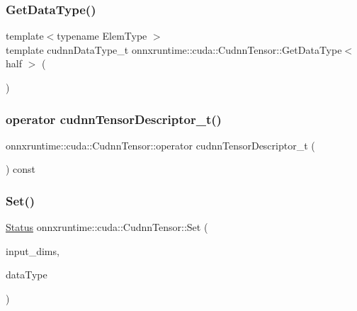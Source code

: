 \subsubsection{\texorpdfstring{Get\+Data\+Type()}{GetDataType()}}
{\footnotesize\ttfamily template$<$typename Elem\+Type $>$ \\
template cudnn\+Data\+Type\+\_\+t onnxruntime\+::cuda\+::\+Cudnn\+Tensor\+::\+Get\+Data\+Type$<$ half $>$ (\begin{DoxyParamCaption}{ }\end{DoxyParamCaption})\hspace{0.3cm}{\ttfamily [static]}}

\mbox{\label{classonnxruntime_1_1cuda_1_1CudnnTensor_ad3505f7bba117518557c347875f4f209}} 
\subsubsection{\texorpdfstring{operator cudnn\+Tensor\+Descriptor\+\_\+t()}{operator cudnnTensorDescriptor\_t()}}
{\footnotesize\ttfamily onnxruntime\+::cuda\+::\+Cudnn\+Tensor\+::operator cudnn\+Tensor\+Descriptor\+\_\+t (\begin{DoxyParamCaption}{ }\end{DoxyParamCaption}) const\hspace{0.3cm}{\ttfamily [inline]}}

\mbox{\label{classonnxruntime_1_1cuda_1_1CudnnTensor_a04f694f3b72ff6ac06511008d97c451d}} 
\subsubsection{\texorpdfstring{Set()}{Set()}\hspace{0.1cm}{\footnotesize\ttfamily [1/2]}}
{\footnotesize\ttfamily \mbox{\hyperlink{classonnxruntime_1_1common_1_1Status}{Status}} onnxruntime\+::cuda\+::\+Cudnn\+Tensor\+::\+Set (\begin{DoxyParamCaption}\item[{const std\+::vector$<$ int64\+\_\+t $>$ \&}]{input\+\_\+dims,  }\item[{cudnn\+Data\+Type\+\_\+t}]{data\+Type }\end{DoxyParamCaption})}

